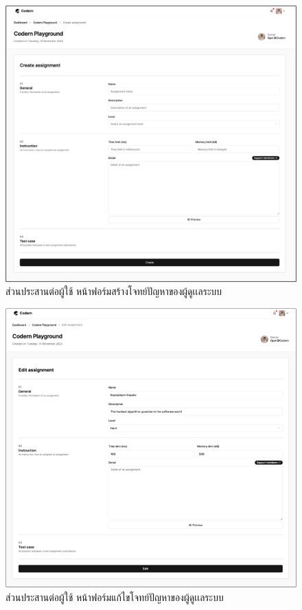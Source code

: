 \documentclass[12pt,one side,openright,a4paper]{cpe-thesis-th}
\begin{document}
    \hypertarget{ui-assign3}{
        \begin{figure}[H]
        \centering
            \includegraphics[width=15cm]{figure/ui/ui-assign3.png}
            \caption[ส่วนประสานต่อผู้ใช้ หน้าฟอร์มสร้างโจทย์ปัญหาของผู้ดูเเลระบบ]{ ส่วนประสานต่อผู้ใช้ หน้าฟอร์มสร้างโจทย์ปัญหาของผู้ดูเเลระบบ}
            \label{fig:ui-assign3}
        \end{figure}
    }
    \hypertarget{ui-assign4}{
        \begin{figure}[H]
        \centering
            \includegraphics[width=15cm]{figure/ui/ui-assign4.png}
            \caption[ส่วนประสานต่อผู้ใช้ หน้าฟอร์มแก้ไขโจทย์ปัญหาของผู้ดูเเลระบบ]{ ส่วนประสานต่อผู้ใช้ หน้าฟอร์มแก้ไขโจทย์ปัญหาของผู้ดูเเลระบบ}
            \label{fig:ui-assign4}
        \end{figure}
    }
\end{document}

